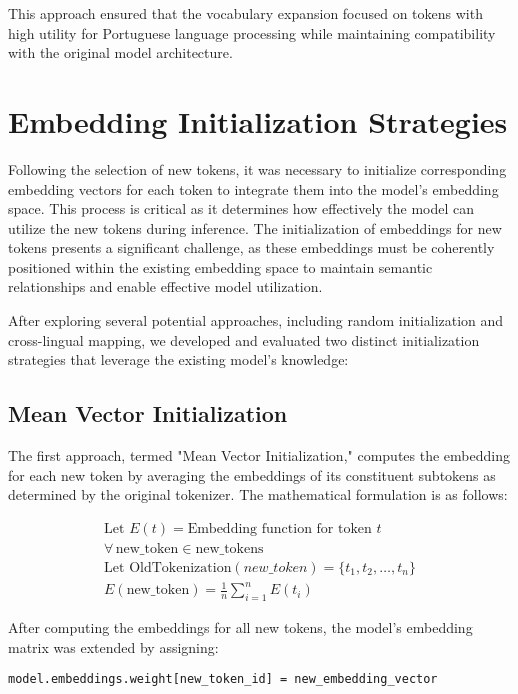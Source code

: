 This approach ensured that the vocabulary expansion focused on tokens with high utility for Portuguese language processing while maintaining compatibility with the original model architecture.

\section{Embedding Initialization Strategies}
Following the selection of new tokens, it was necessary to initialize corresponding embedding vectors for each token to integrate them into the model's embedding space. This process is critical as it determines how effectively the model can utilize the new tokens during inference. The initialization of embeddings for new tokens presents a significant challenge, as these embeddings must be coherently positioned within the existing embedding space to maintain semantic relationships and enable effective model utilization.

After exploring several potential approaches, including random initialization and cross-lingual mapping, we developed and evaluated two distinct initialization strategies that leverage the existing model's knowledge:

\subsection{Mean Vector Initialization}
The first approach, termed "Mean Vector Initialization," computes the embedding for each new token by averaging the embeddings of its constituent subtokens as determined by the original tokenizer. The mathematical formulation is as follows:

$$
\begin{array}{c}
    \text{Let } E(t) = \text{Embedding function for token } t \\
    \forall\, \text{new\_token} \in \text{new\_tokens} \\
    \text{Let } \text{OldTokenization}(new\_token) = \{t_1, t_2, \ldots, t_n\} \\
    E(\text{new\_token}) = \frac{1}{n} \sum_{i=1}^{n} E(t_i)
\end{array}
$$

After computing the embeddings for all new tokens, the model's embedding matrix was extended by assigning:

\begin{verbatim}
model.embeddings.weight[new_token_id] = new_embedding_vector
\end{verbatim}

